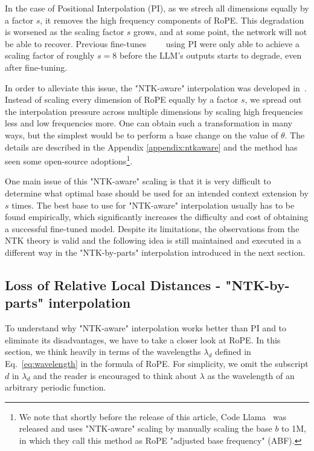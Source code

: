 \documentclass{article} %
\begin{document}
In the case of Positional Interpolation (PI), as we strech all dimensions equally by a factor $s$, it removes the high frequency components of RoPE. This degradation is worsened as the scaling factor $s$ grows, and at some point, the network will not be able to recover. Previous fine-tunes~\citep{kaiokendev}~\citep{chen2023extending}~\citep{together}~\citep{llongma} using PI were only able to achieve a scaling factor of roughly $s=8$ before the LLM's outputs starts to degrade, even after fine-tuning.


In order to alleviate this issue, the "NTK-aware" interpolation was developed in~\citep{blocntkaware}. Instead of scaling every dimension of RoPE equally by a factor $s$, we spread out the interpolation pressure across multiple dimensions by scaling high frequencies less and low frequencies more. One can obtain such a transformation in many ways, but the simplest would be to perform a base change on the value of $\theta$. The details are described in the Appendix \ref{appendix:ntkaware} and the method has seen some open-source adoptions\footnote{We note that shortly before the release of this article, Code Llama~\citep{rozière2023code} was released and uses "NTK-aware" scaling by manually scaling the base $b$ to 1M, in which they call this method as RoPE "adjusted base frequency" (ABF).}.

One main issue of this "NTK-aware" scaling is that it is very difficult to determine what optimal base should be used for an intended context extension by $s$ times. The best base to use for "NTK-aware" interpolation usually has to be found empirically, which significantly increases the difficulty and cost of obtaining a successful fine-tuned model. Despite its limitations, the observations from the NTK theory is valid and the following idea is still maintained and executed in a different way in the "NTK-by-parts" interpolation introduced in the next section.%

\subsection{Loss of Relative Local Distances - "NTK-by-parts" interpolation} \label{sec:ntkparts} %

To understand why "NTK-aware" interpolation works better than PI and to eliminate its disadvantages, we have to take a closer look at RoPE. In this section, we think heavily in terms of the wavelengths $\lambda_d$ defined in Eq.~\ref{eq:wavelength} in the formula of RoPE. For simplicity, we omit the subscript $d$ in $\lambda_d$ and the reader is encouraged to think about $\lambda$ as the wavelength of an arbitrary periodic function.
\end{document}
